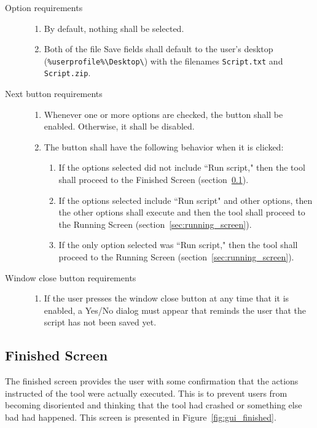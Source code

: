 \begin{description}
\item[Option requirements] \hfill
\begin{enumerate}
  \item By default, nothing shall be selected.
  \item Both of the file Save fields shall default to the user's desktop
  (\verb|%userprofile%\Desktop\|) with the filenames \verb|Script.txt| and
  \verb|Script.zip|.
\end{enumerate}
\item[Next button requirements] \hfill
\begin{enumerate}
  \item Whenever one or more options are checked, the button shall be enabled.
  Otherwise, it shall be disabled.
  \item The button shall have the following behavior when it is clicked:
  \begin{enumerate}
    \item If the options selected did not include ``Run script," then the tool
    shall proceed to the Finished Screen (section~\ref{sec:finished_screen}).
    \item If the options selected include ``Run script" and other options, then
    the other options shall execute and then the tool shall proceed to the
    Running Screen (section~\ref{sec:running_screen}).
    \item If the only option selected was ``Run script," then the tool shall
    proceed to the Running Screen (section~\ref{sec:running_screen}).
  \end{enumerate}
\end{enumerate}
\item[Window close button requirements] \hfill
\begin{enumerate}
  \item If the user presses the window close button at any time that it is
  enabled, a Yes/No dialog must appear that reminds the user that the script
  has not been saved yet.
\end{enumerate}
\end{description}

\subsection{Finished Screen} \label{sec:finished_screen}
The finished screen provides the user with some confirmation that the actions
instructed of the tool were actually executed.  This is to prevent users from
becoming disoriented and thinking that the tool had crashed or something else
bad had happened.  This screen is presented in Figure~\ref{fig:gui_finished}.

